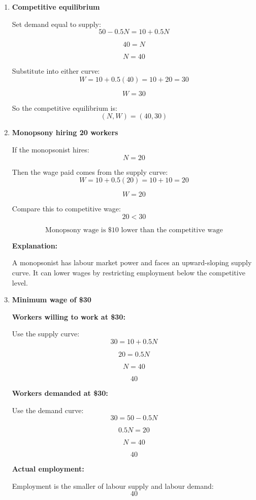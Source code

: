 \documentclass[12pt]{article}
\begin{document}
\begin{enumerate}[label=(\alph*)]

\item \textbf{Competitive equilibrium}

Set demand equal to supply:
\[
50-0.5N=10+0.5N
\]

\[
40=N
\]

\[
\boxed{N=40}
\]

Substitute into either curve:
\[
W=10+0.5(40)=10+20=30
\]

\[
\boxed{W=30}
\]

So the competitive equilibrium is:
\[
\boxed{(N,W)=(40,30)}
\]


\item \textbf{Monopsony hiring 20 workers}

If the monopsonist hires:
\[
N=20
\]

Then the wage paid comes from the supply curve:
\[
W=10+0.5(20)=10+10=20
\]

\[
\boxed{W=20}
\]

Compare this to competitive wage:
\[
20<30
\]

\[
\boxed{\text{Monopsony wage is \$10 lower than the competitive wage}}
\]

\textbf{Explanation:}

A monopsonist has labour market power and faces an upward-sloping supply curve. It can lower wages by restricting employment below the competitive level.


\item \textbf{Minimum wage of \$30}

\textbf{Workers willing to work at \$30:}

Use the supply curve:
\[
30=10+0.5N
\]

\[
20=0.5N
\]

\[
N=40
\]

\[
\boxed{40}
\]

\textbf{Workers demanded at \$30:}

Use the demand curve:
\[
30=50-0.5N
\]

\[
0.5N=20
\]

\[
N=40
\]

\[
\boxed{40}
\]

\textbf{Actual employment:}

Employment is the smaller of labour supply and labour demand:
\[
\boxed{40}
\]


\end{enumerate}
\end{document}
